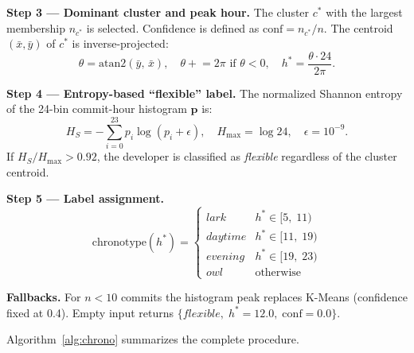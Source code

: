 \documentclass[conference]{IEEEtran}
\begin{document}
\textbf{Step 3 — Dominant cluster and peak hour.}
The cluster $c^*$ with the largest membership $n_{c^*}$ is selected.
Confidence is defined as $\mathrm{conf} = n_{c^*}/n$.
The centroid $(\bar{x},\bar{y})$ of $c^*$ is inverse-projected:
\begin{equation}
  \theta = \mathrm{atan2}(\bar{y},\,\bar{x}),\quad
  \theta \mathrel{+}= 2\pi \text{ if } \theta < 0,\quad
  h^* = \frac{\theta \cdot 24}{2\pi}.
  \label{eq:peakhour}
\end{equation}

\textbf{Step 4 — Entropy-based ``flexible'' label.}
The normalized Shannon entropy of the 24-bin commit-hour histogram
$\mathbf{p}$ is:
\begin{equation}
  H_S = -\sum_{i=0}^{23} p_i \log(p_i + \epsilon),\quad
  H_{\max} = \log 24,\quad \epsilon = 10^{-9}.
  \label{eq:entropy}
\end{equation}
If $H_S / H_{\max} > 0.92$, the developer is classified as
\textit{flexible} regardless of the cluster centroid.

\textbf{Step 5 — Label assignment.}
\begin{equation}
  \mathrm{chronotype}(h^*) =
  \begin{cases}
    \textit{lark}    & h^* \in [5,\;11) \\
    \textit{daytime} & h^* \in [11,\;19) \\
    \textit{evening} & h^* \in [19,\;23) \\
    \textit{owl}     & \text{otherwise}
  \end{cases}
  \label{eq:label}
\end{equation}

\textbf{Fallbacks.}
For $n < 10$ commits the histogram peak replaces K-Means (confidence
fixed at 0.4). Empty input returns
$\{\textit{flexible},\; h^*{=}12.0,\; \mathrm{conf}{=}0.0\}$.

Algorithm~\ref{alg:chrono} summarizes the complete procedure.
\end{document}
